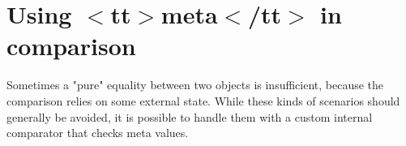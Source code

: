 \chapter{Using \texorpdfstring{$<$}{<}tt\texorpdfstring{$>$}{>}meta\texorpdfstring{$<$}{<}/tt\texorpdfstring{$>$}{>} in comparison}
\hypertarget{md_node__modules_2fast-equals_2recipes_2using-meta-in-comparison}{}\label{md_node__modules_2fast-equals_2recipes_2using-meta-in-comparison}
\label{md_node__modules_2fast-equals_2recipes_2using-meta-in-comparison_autotoc_md15083}%
%


Sometimes a "{}pure"{} equality between two objects is insufficient, because the comparison relies on some external state. While these kinds of scenarios should generally be avoided, it is possible to handle them with a custom internal comparator that checks {\ttfamily meta} values.


\begin{DoxyCode}{0}
\DoxyCodeLine{}
\DoxyCodeLine{\}}
\DoxyCodeLine{}
\DoxyCodeLine{}
\DoxyCodeLine{\});}

\end{DoxyCode}
 